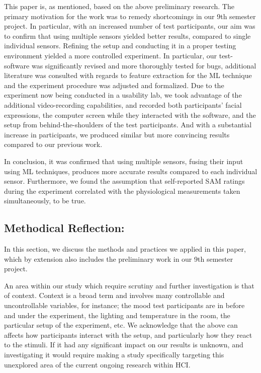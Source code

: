 This paper is, as mentioned, based on the above preliminary research. The
primary motivation for the work was to remedy shortcomings in our 9th semester
project. In particular, with an increased number of test participants, our aim
was to confirm that using multiple sensors yielded better results, compared to single individual sensors.
Refining the setup and conducting it in a proper testing environment yielded a more
controlled experiment. In particular, our test-software was significantly
revised and more thoroughly tested for bugs, additional literature was consulted
with regards to feature extraction for the ML technique and the experiment procedure was
adjusted and formalized. Due to the experiment now being conducted in a
usability lab, we took advantage of the additional video-recording capabilities,
and recorded both participants' facial expressions, the computer screen while
they interacted with the software, and the setup from behind-the-shoulders of
the test participants. And with a substantial increase in participants, we
produced similar but more convincing results compared to our previous work.

In conclusion, it was confirmed that using multiple sensors, fusing their input
using ML techniques, produces more accurate results compared to each individual
sensor. Furthermore, we found the assumption that self-reported SAM ratings
during the experiment correlated with the physiological measurements taken
simultaneously, to be true.

\subsection{Methodical Reflection:}
In this section, we discuss the methods and practices we applied in this paper,
which by extension also includes the preliminary work in our 9th semester
project.

An area within our study which require scrutiny and further investigation is
that of context. Context is a broad term and involves many controllable and
uncontrollable variables, for instance; the mood test participants are in
before and under the experiment, the lighting and temperature in the room, the
particular setup of the experiment, etc. We acknowledge that the above can
affects how participants interact with the setup, and particularly how they
react to the stimuli. If it had any significant impact on our results is
unknown, and investigating it would require making a study specifically targeting this unexplored area of the current ongoing research within HCI.

